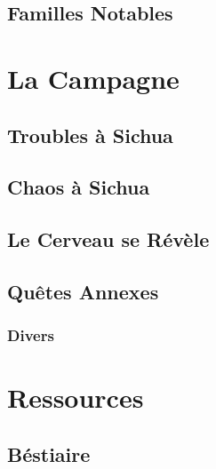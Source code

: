 \documentclass{dd}
\begin{document}






\chapter{Familles Notables}



\part{La Campagne}


\chapter{Troubles à Sichua}



\chapter{Chaos à Sichua}


\chapter{Le Cerveau se Révèle}


\chapter{Quêtes Annexes}



\section{Divers}



\part{Ressources}

\chapter{Béstiaire}
\end{document}
